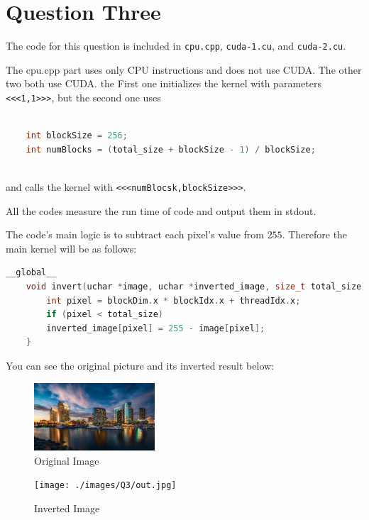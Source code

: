 \documentclass[12pt]{article}
\begin{document}
	
	

	\section{Question Three}
	
	
The code for this question is included in \Verb+cpu.cpp+, \Verb+cuda-1.cu+, and \Verb+cuda-2.cu+.

The cpu.cpp part uses only CPU instructions and does not use CUDA. The other two both use CUDA. the First one initializes the kernel with parameters \verb+<<<1,1>>>+, but the second one uses

\begin{lstlisting}[language=c++]
	
	int blockSize = 256;
	int numBlocks = (total_size + blockSize - 1) / blockSize;
	
\end{lstlisting}

and calls the kernel with \verb+<<<numBlocsk,blockSize>>>+.

All the codes measure the run time of code and output them in stdout.


The code's main logic is to subtract each pixel's value from $255$. Therefore the main kernel will be as follows:

\begin{lstlisting}[language=c++]
	__global__
	void invert(uchar *image, uchar *inverted_image, size_t total_size) {
		int pixel = blockDim.x * blockIdx.x + threadIdx.x;
		if (pixel < total_size)
		inverted_image[pixel] = 255 - image[pixel];
	}
\end{lstlisting}

You can see the original picture and its inverted result below:


\begin{figure}[H]
	\centering
	\includegraphics[width=0.4\textwidth]{./images/Q3/pic3.jpg}	
	\cprotect\caption{Original Image}
	\label{fig:2-1}
\end{figure}

\begin{figure}[H]
	\centering
	\texttt{[image: ./images/Q3/out.jpg]}	
	\cprotect\caption{Inverted Image}
	\label{fig:2-2}
\end{figure}
\end{document}

